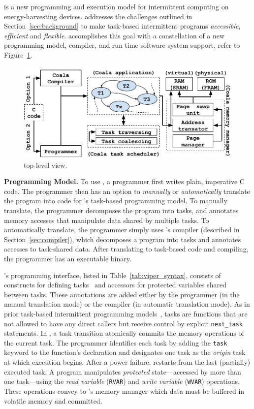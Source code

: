 \sys is a new programming and execution model for intermittent computing on energy-harvesting devices. \sys addresses the challenges outlined in Section~\ref{sec:background} to make task-based intermittent programs {\em accessible}, {\em efficient} and {\em flexible}. \sys accomplishes this goal with a constellation of a new programming model, compiler, and run time software system support, refer to Figure~\ref{fig:system_overview}.

\begin{figure}
	\centering
	\includegraphics[width=\columnwidth]{figures/viper_block_diagram.pdf}
	\caption{\sys top-level view.}
	\label{fig:system_overview}
\end{figure}

\textbf{\sys Programming Model.} To use \sys, a programmer first writes plain, imperative C code. The programmer then has an option to {\em manually} or {\em automatically} translate the program into code for \sys's task-based programming model. To manually translate, the programmer decomposes the program into tasks, and annotates memory accesses that manipulate data shared by multiple tasks. To automatically translate, the programmer simply uses \sys's compiler (described in Section~\ref{sec:compiler}), which decomposes a program into tasks and annotates accesses to task-shared data. After translating to task-based code and compiling, the programmer has an executable \sys binary.

\sys's programming interface, listed in Table~\ref{tab:viper_syntax}, consists of
constructs for defining tasks~\cite{chain,alpaca} and accessors for
protected variables shared between tasks. These annotations are added either by
the programmer (in the manual translation mode) or the compiler (in automatic
translation mode). As in prior task-based intermittent programming
models~\cite{chain,alpaca}, tasks are functions that are not allowed to have
any direct callers but receive control by explicit {\tt next\_task} statements.
In \sys, a task transition atomically commits the memory operations of the
current task. The programmer identifies each task by adding the {\tt task}
keyword to the function's declaration and designates one task as the {\em
origin} task at which execution begins. After a power failure,
\sys restarts from the last (partially) executed task.
%
A \sys program manipulates {\em protected} state---accessed by more than one
task---using the \emph{read variable} ({\tt RVAR}) and \emph{write variable}
({\tt WVAR}) operations. These operations convey to \sys's memory manager which
data must be buffered in volatile memory and committed.


